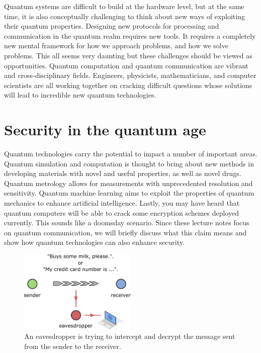 Quantum systems are difficult to build at the hardware level, but at the same time, it is also conceptually challenging to think about new ways of exploiting their quantum properties.
Designing new protocols for processing and communication in the quantum realm requires new tools.
It requires a completely new mental framework for how we approach problems, and how we solve problems.
This all seems very daunting but these challenges should be viewed as opportunities.
Quantum computation and quantum communication are vibrant and cross-disciplinary fields.
Engineers, physicists, mathematicians, and computer scientists are all working together on cracking difficult questions whose solutions will lead to incredible new quantum technologies.

\section{Security in the quantum age}

Quantum technologies carry the potential to impact a number of important areas.
Quantum simulation and computation is thought to bring about new methods in developing materials with novel and useful properties, as well as novel drugs.
Quantum metrology allows for measurements with unprecedented resolution and sensitivity.
Quantum machine learning aims to exploit the properties of quantum mechanics to enhance artificial intelligence.
Lastly, you may have heard that quantum computers will be able to crack some encryption schemes deployed currently.
This sounds like a doomsday scenario.
Since these lecture notes focus on quantum communication, we will briefly discuss what this claim means and show how quantum technologies can also enhance security.

\begin{figure}[t]
    \centering
    \includegraphics[width=0.5\textwidth]{lesson1/1-5_security.pdf}
    \caption[Security in the quantum age.]{An eavesdropper is trying to intercept and decrypt the message sent from the sender to the receiver.}
    \label{fig:1-5_security}
\end{figure}

